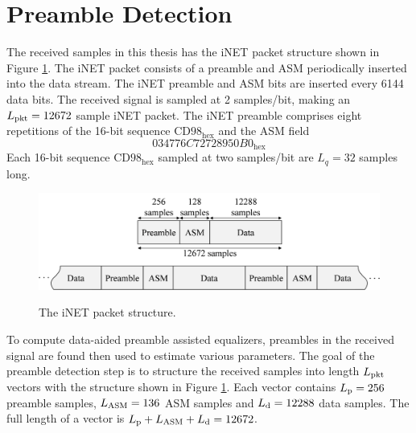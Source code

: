 \section{Preamble Detection}
The received samples in this thesis has the iNET packet structure shown in Figure \ref{fig:packet}.
The iNET packet consists of a preamble and ASM periodically inserted into the data stream.
The iNET preamble and ASM bits are inserted every 6144 data bits.
The received signal is sampled at 2 samples/bit, making an $L_\text{pkt}=12672$ sample iNET packet.
The iNET preamble comprises eight repetitions of the 16-bit sequence $\text{CD98}_\text{hex}$ and the ASM field
\begin{equation}
034776C72728950B0_\text{hex}
\end{equation}
Each 16-bit sequence $\text{CD98}_\text{hex}$ sampled at two samples/bit are $L_q=32$ samples long.
\begin{figure}
	\caption{The iNET packet structure.}
	\centering\includegraphics[width=9.47in/100*55]{figures/systemOverview/packetStructure.pdf}
	\label{fig:packet}
\end{figure}

To compute data-aided preamble assisted equalizers, preambles in the received signal are found then used to estimate various parameters.
The goal of the preamble detection step is to structure the received samples into length $L_\text{pkt}$ vectors with the structure shown in Figure \ref{fig:packet}.
Each vector contains $L_\text{p} = 256$ preamble samples, $L_\text{ASM} = 136$ ASM samples and $L_\text{d} = 12288$ data samples.
The full length of a vector is $L_\text{p} + L_\text{ASM} + L_\text{d} = 12672$.

